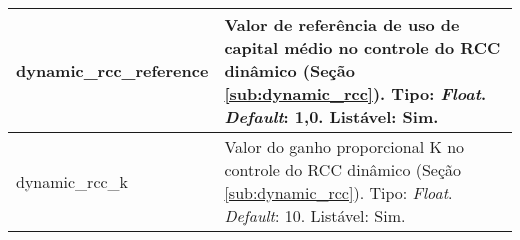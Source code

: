 \begin{center}
{\begin{longtable}[m]{| m{11em} | m{21em} |}
        \hline
        dynamic\_rcc\_reference & Valor de referência de uso de capital médio no controle do RCC dinâmico (Seção \ref{sub:dynamic_rcc}). Tipo: \textit{Float}. \textit{Default}: 1,0. Listável: Sim. \\
        \hline
        dynamic\_rcc\_k & Valor do ganho proporcional K no controle do RCC dinâmico (Seção \ref{sub:dynamic_rcc}). Tipo: \textit{Float}. \textit{Default}: 10. Listável: Sim. \\
        \hline


    \end{longtable}}
\end{center}




